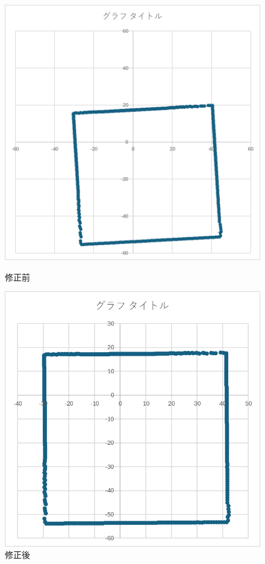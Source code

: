 \documentclass[dvipdfmx,a4paper]{jsarticle}
\begin{document}
    \begin{figure}[H]
      \begin{minipage}[b]{0.45\linewidth}
        \centering
        \includegraphics[keepaspectratio, scale=0.5]{Photo/image-8.png}
        \caption{修正前}
      \end{minipage}
      \begin{minipage}[b]{0.45\linewidth}
        \centering
        \includegraphics[keepaspectratio, scale=0.5]{Photo/image-9.png}
        \caption{修正後}
      \end{minipage}
    \end{figure}
\end{document}
